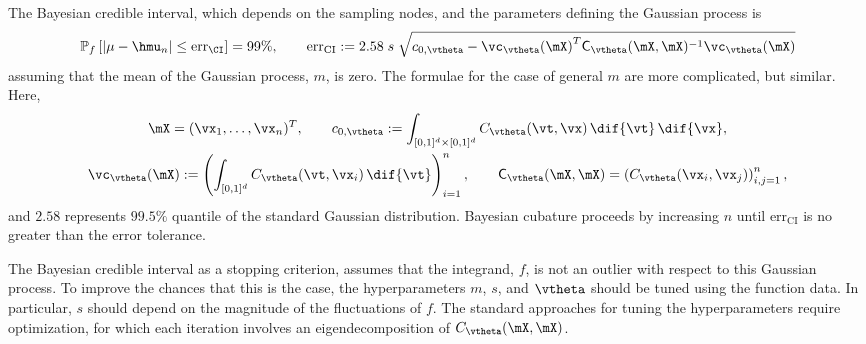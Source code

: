 The Bayesian credible interval, which depends on the sampling nodes, and the parameters defining the Gaussian process is \cite{RatHic19a}
\begin{equation*}
 \mathbb{P}_f \left[
|\mu-\hmu_n| \leq \text{err}_\CI
\right] = 99\%, \qquad
{\text{err}_{\text{CI}}} := 2.58 \; s \; \sqrt{c_{0,{\vtheta}} - {\vc_{\vtheta}(\mX)}^T \mathsf{C}_{\vtheta}(\mX,\mX)^{-1}\vc_{\vtheta}(\mX)}
\end{equation*}
assuming that the mean of the Gaussian process, $m$, is zero. The formulae for the case of general $m$ are more complicated, but similar. Here,
\begin{gather*}
\label{eqn:fGaussDist_c0}
	\mX = ({\vx}_1, \ldots, {\vx}_n)^T, \qquad c_{0,{\vtheta}} := \int_{[0,1]^{d} \times [0,1]^{d}} C_{\vtheta} (\vt,\vx) \, \dif{\vt} \, \dif{\vx} , \\
 \vc_{\vtheta}(\mX) := \left(  \int_{[0,1]^d} C_{\vtheta} (\vt,\vx_i) \, \dif{\vt} \right)_{i=1}^n, \qquad \mathsf{C}_{\vtheta}(\mX,\mX) = \left(  C_{\vtheta}({\vx}_i,{\vx}_j)  \right)_{i,j=1}^n,
	\end{gather*}
and $2.58$ represents $99.5\%$ quantile of the standard Gaussian distribution.  
Bayesian cubature proceeds by increasing $n$ until $\text{err}_{\text{CI}}$ is no greater than the error tolerance.  

The Bayesian credible interval as a stopping criterion, assumes that the integrand, $f$, is not an outlier with respect to this Gaussian process.  To improve the chances that this is the case, the hyperparameters $m$, $s$, and $\vtheta$ should be tuned using the function data.  In particular, $s$ should depend on the magnitude of the fluctuations of $f$.  The standard approaches for tuning the hyperparameters require optimization, for which each iteration involves an eigendecomposition of $ C_{\vtheta}(\mX,\mX)$.

